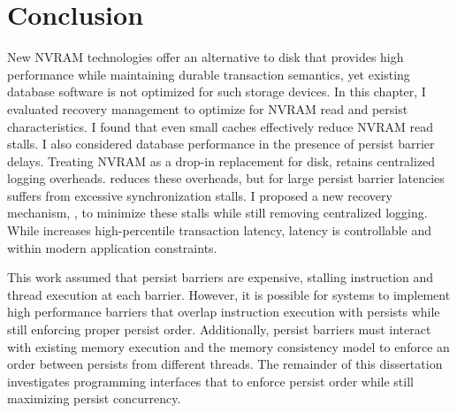 \section{Conclusion}
\label{sec:OLTP_eval:Conclusion}
New NVRAM technologies offer an alternative to disk that provides high performance while maintaining durable transaction semantics, yet existing database software is not optimized for such storage devices.
In this chapter, I evaluated recovery management to optimize for NVRAM read and persist characteristics.
I found that even small caches effectively reduce NVRAM read stalls.
I also considered database performance in the presence of persist barrier delays.
Treating NVRAM as a drop-in replacement for disk, \NVDisk retains centralized logging overheads.
\InPlace reduces these overheads, but for large persist barrier latencies suffers from excessive synchronization stalls.
I proposed a new recovery mechanism, \GroupCommit, to minimize these stalls while still removing centralized logging.
While \GroupCommit increases high-percentile transaction latency, latency is controllable and within modern application constraints.

This work assumed that persist barriers are expensive, stalling instruction and thread execution at each barrier.
However, it is possible for systems to implement high performance barriers that overlap instruction execution with persists while still enforcing proper persist order.
Additionally, persist barriers must interact with existing memory execution and the memory consistency model to enforce an order between persists from different threads.
The remainder of this dissertation investigates programming interfaces that to enforce persist order while still maximizing persist concurrency.
